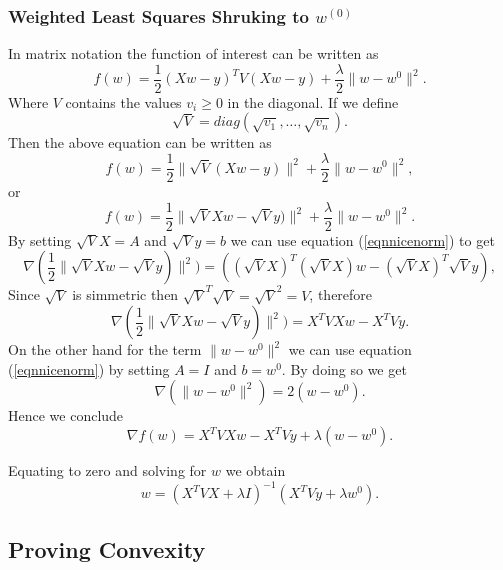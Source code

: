 \documentclass[11pt]{article}
\theoremstyle{plain}
\begin{document}
\subsubsection{Weighted Least Squares Shruking to $w^{(0)}$}
In matrix notation the function of interest can be written as
\begin{equation*}
f(w)=\frac{1}{2} (Xw-y)^{T}V(Xw-y)+\frac{\lambda}{2}\|w-w^{0}\|^{2}.
\end{equation*}
Where $V$ contains the values $v_{i}\geq 0$ in the diagonal. If we define 
\begin{equation*}
\sqrt{V}=diag(\sqrt{v_{1}},\ldots,\sqrt{v_{n}}).
\end{equation*}
Then the above equation can be written as
\begin{equation*}
f(w)=\frac{1}{2}\|\sqrt{V}(Xw-y)\|^{2}+\frac{\lambda}{2}\|w-w^{0}\|^{2},
\end{equation*}
or
\begin{equation*}
f(w)=\frac{1}{2}\|\sqrt{V}Xw-\sqrt{V}y)\|^{2}+\frac{\lambda}{2}\|w-w^{0}\|^{2}.
\end{equation*}
By setting $\sqrt{V}X=A$ and $\sqrt{V}y=b$ we can use equation (\ref{eqnnicenorm}) to get
\begin{equation*}
\nabla(\frac{1}{2}\|\sqrt{V}Xw-\sqrt{V}y)\|^{2})=((\sqrt{V}X)^{T}(\sqrt{V}X)w-(\sqrt{V}X)^{T}\sqrt{V}y),
\end{equation*}
Since $\sqrt{V}$ is simmetric then $\sqrt{V}^{T}\sqrt{V}=\sqrt{V}^{2}=V$, therefore 
\begin{equation*}
\nabla(\frac{1}{2}\|\sqrt{V}Xw-\sqrt{V}y)\|^{2})=X^{T}VXw-X^{T}Vy.
\end{equation*}
On the other hand for the term $\|w-w^{0}\|^{2}$ we can use equation (\ref{eqnnicenorm}) by setting
$A=I$ and $b=w^{0}$. By doing so we get
\begin{equation*}
\nabla(\|w-w^{0}\|^{2})=2(w-w^{0}).
\end{equation*}
Hence we conclude
\begin{equation*}
\nabla f(w)=X^{T}VXw-X^{T}Vy+\lambda(w-w^{0}).
\end{equation*}

Equating to zero and solving for $w$ we obtain
\begin{equation*}
w=\left(X^ {T}VX+\lambda I\right)^{-1}\left(X^{T}Vy+\lambda w^{0}\right).
\end{equation*}

\subsection{Proving Convexity}
\end{document}
